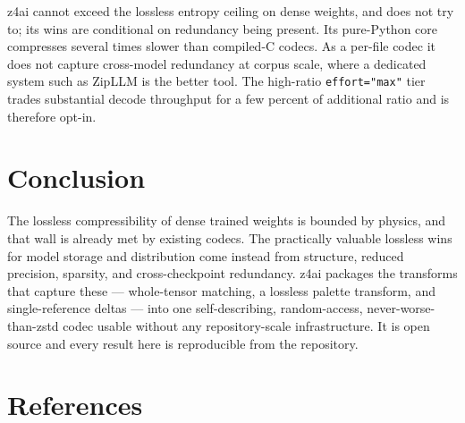 \documentclass[
]{article}
\begin{document}
z4ai cannot exceed the lossless entropy ceiling on dense weights, and
does not try to; its wins are conditional on redundancy being present.
Its pure-Python core compresses several times slower than compiled-C
codecs. As a per-file codec it does not capture cross-model redundancy
at corpus scale, where a dedicated system such as ZipLLM is the better
tool. The high-ratio \texttt{effort="max"} tier trades substantial
decode throughput for a few percent of additional ratio and is therefore
opt-in.

\section{Conclusion}\label{conclusion}

The lossless compressibility of dense trained weights is bounded by
physics, and that wall is already met by existing codecs. The
practically valuable lossless wins for model storage and distribution
come instead from structure, reduced precision, sparsity, and
cross-checkpoint redundancy. z4ai packages the transforms that capture
these --- whole-tensor matching, a lossless palette transform, and
single-reference deltas --- into one self-describing, random-access,
never-worse-than-zstd codec usable without any repository-scale
infrastructure. It is open source and every result here is reproducible
from the repository.

\section*{References}\label{references}
\end{document}
